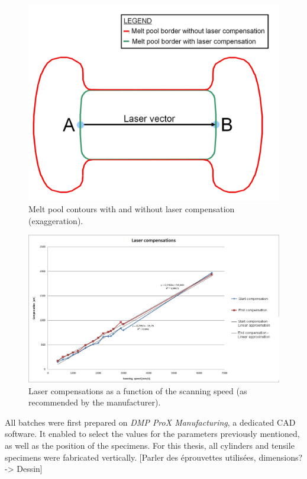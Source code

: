 \begin{figure}[th]
\centering
\includegraphics[scale=0.3]{Images/Compens}
\decoRule
\caption[Melt pool contours with and without laser compensation (exaggeration)]{Melt pool contours with and without laser compensation (exaggeration).}
\label{fig:Compens}
\end{figure}

\begin{figure}[th]
\centering
\includegraphics[scale=0.45]{Images/Compens1}
\decoRule
\caption[Laser compensations as a function of the scanning speed (as recommended by the manufacturer)]{Laser compensations as a function of the scanning speed (as recommended by the manufacturer).}
\label{fig:Compens1}
\end{figure}

All batches were first prepared on \textit{DMP ProX Manufacturing}, a dedicated CAD software. It enabled to select the values for the parameters previously mentioned, as well as the position of the specimens. For this thesis, all cylinders and tensile specimens were fabricated vertically. [Parler des éprouvettes utilisées, dimensions? -> Dessin]\\

